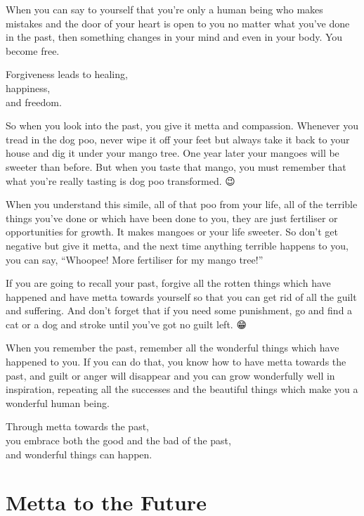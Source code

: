 \documentclass[12pt, openany]{book}
\newenvironment{aphorism}%
{%
\begin{center}\begin{itshape}
}%
{\end{itshape}\end{center}
}%
\newcommand{\fleuron}{%
\begin{center}
\vspace{2em}
\fallbackfont{❦}
\end{center}
}
\begin{document}
When you can say to yourself that you’re only a human being who makes mistakes and the door of your heart is open to you no matter what you’ve done in the past, then something changes in your mind and even in your body. You become free. 

\begin{aphorism}
Forgiveness leads to healing,\\  
happiness,\\ 
and freedom.
\end{aphorism}

So when you look into the past, you give it metta and compassion. Whenever you tread in the dog poo, never wipe it off your feet but always take it back to your house and dig it under your mango tree. One year later your mangoes will be sweeter than before. But when you taste that mango, you must remember that what you’re really tasting is dog poo transformed. 😉 

When you understand this simile, all of that poo from your life, all of the terrible things you’ve done or which have been done to you, they are just fertiliser or opportunities for growth. It makes mangoes or your life sweeter. So don’t get negative but give it metta, and the next time anything terrible happens to you, you can say, “Whoopee! More fertiliser for my mango tree!” 

If you are going to recall your past, forgive all the rotten things which have happened and have metta towards yourself so that you can get rid of all the guilt and suffering. And don’t forget that if you need some punishment, go and find a cat or a dog and stroke until you’ve got no guilt left. 😁

When you remember the past, remember all the wonderful things which have happened to you. If you can do that, you know how to have metta towards the past, and guilt or anger will disappear and you can grow wonderfully well in inspiration, repeating all the successes and the beautiful things which make you a wonderful human being. 

\begin{aphorism}
Through metta towards the past,\\  
you embrace both the good and the bad of the past,\\ 
and wonderful things can happen.
\end{aphorism}

\fleuron

\chapter{Metta to the Future} 
\end{document}
